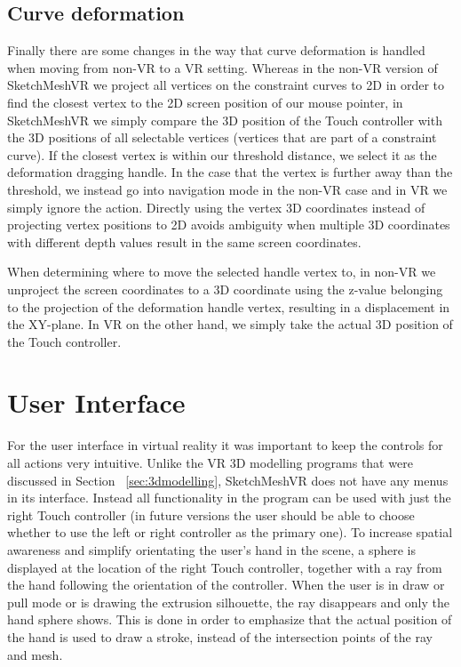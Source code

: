 \subsection{Curve deformation}
Finally there are some changes in the way that curve deformation is handled when moving from non-VR to a VR setting. Whereas in the non-VR version of SketchMeshVR we project all vertices on the constraint curves to 2D in order to find the closest vertex to the 2D screen position of our mouse pointer, in SketchMeshVR we simply compare the 3D position of the Touch controller with the 3D positions of all selectable vertices (vertices that are part of a constraint curve). If the closest vertex is within our threshold distance, we select it as the deformation dragging handle. In the case that the vertex is further away than the threshold, we instead go into navigation mode in the non-VR case and in VR we simply ignore the action. Directly using the vertex 3D coordinates instead of projecting vertex positions to 2D avoids ambiguity when multiple 3D coordinates with different depth values result in the same screen coordinates. 

When determining where to move the selected handle vertex to, in non-VR we unproject the screen coordinates to a 3D coordinate using the z-value belonging to the projection of the deformation handle vertex, resulting in a displacement in the XY-plane. In VR on the other hand, we simply take the actual 3D position of the Touch controller. 

\section{User Interface}
For the user interface in virtual reality it was important to keep the controls for all actions very intuitive. Unlike the VR 3D modelling programs that were discussed in Section ~\ref{sec:3dmodelling}, SketchMeshVR does not have any menus in its interface. Instead all functionality in the program can be used with just the right Touch controller (in future versions the user should be able to choose whether to use the left or right controller as the primary one). To increase spatial awareness and simplify orientating the user's hand in the scene, a sphere is displayed at the location of the right Touch controller, together with a ray from the hand following the orientation of the controller. When the user is in draw or pull mode or is drawing the extrusion silhouette, the ray disappears and only the hand sphere shows. This is done in order to emphasize that the actual position of the hand is used to draw a stroke, instead of the intersection points of the ray and mesh.

